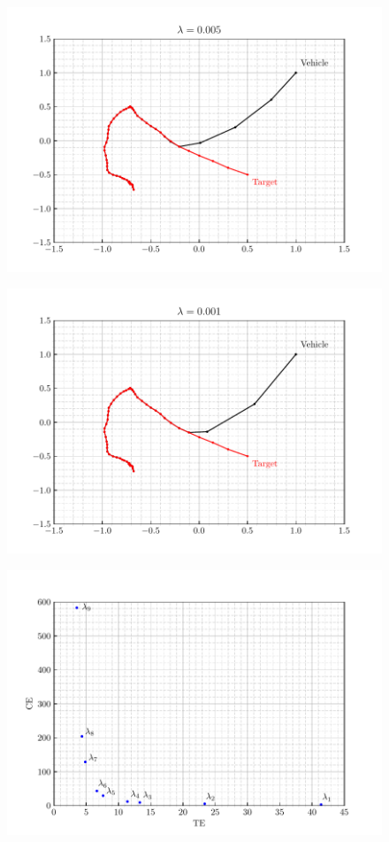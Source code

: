 \documentclass[12pt]{article}
\begin{document}
\begin{figure}[H]
    \centering
    \includegraphics{../../src/task_1/output/ex_1_i=8.pdf}
\end{figure}

\begin{figure}[H]
    \centering
    \includegraphics{../../src/task_1/output/ex_1_i=9.pdf}
\end{figure}

\begin{figure}[H]
    \centering
    \includegraphics{../../src/task_1/output/TEvsCE.pdf}
\end{figure}
\end{document}
